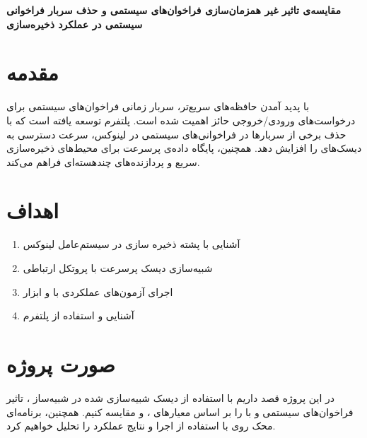 \documentclass[12pt]{article}
\begin{document}
\newpage

\begingroup
\hspace{0.1cm}\Large\textbf{مقایسه‌ی تاثیر غیر همزمان‌سازی فراخوان‌های سیستمی و حذف سربار فراخوانی سیستمی در عملکرد ذخیره‌سازی}
\endgroup

\section*{مقدمه}
با پدید آمدن حافظه‌های سریع‌تر، سربار زمانی فراخوان‌های سیستمی برای درخواست‌های ورودی/خروجی حائز اهمیت شده است. پلتفرم  توسعه یافته است که با حذف برخی از سربارها در فراخوانی‌های سیستمی در لینوکس، سرعت دسترسی به دیسک‌های  را افزایش دهد. همچنین،  پایگاه داده‌ی پرسرعت   برای محیط‌های ذخیره‌سازی سریع و پردازنده‌های چندهسته‌ای فراهم می‌کند.

\section*{اهداف}
\begin{enumerate}
	\item 
	آشنایی با پشته ذخیره سازی در سیستم‌عامل لینوکس
	\item
	شبیه‌سازی دیسک پرسرعت با پروتکل ارتباطی 
	\item 
	اجرای آزمون‌های عملکردی با  و ابزار 
	\item 
	آشنایی و استفاده از پلتفرم 
\end{enumerate}

\section*{صورت پروژه}
در این پروژه قصد داریم با استفاده از دیسک شبیه‌سازی شده  در شبیه‌ساز ، تاثیر فراخوان‌های سیستمی  و  با  را بر اساس معیارهای ،  و  مقایسه کنیم. همچنین، برنامه‌ای محک  روی  با استفاده از  اجرا و نتایج عملکرد را تحلیل خواهیم کرد.
\end{document}
